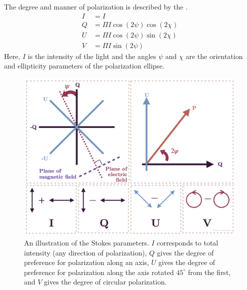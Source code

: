 The degree and manner of polarization is described by the .
\begin{align}
    I &= I \\
    Q &= \Pi I \cos(2\psi) \cos(2\chi) \\
    U &= \Pi I \cos(2\psi) \sin(2\chi) \\
    V &= \Pi I \sin(2\psi)
\end{align}
Here, $I$ is the intensity of the light and the angles $\psi$ and $\chi$ are the orientation and ellipticity parameters of the polarization ellipse.
\begin{figure}
    \centering
    \includegraphics[width=0.5\linewidth]{figures/stokes.png}
    \caption{An illustration of the Stokes parameters. $I$ corresponds to total intensity (any direction of polarization), $Q$ gives the degree of preference for polarization along an axis, $U$ gives the degree of preference for polarization along the axis rotated $45^\circ$ from the first, and $V$ gives the degree of circular polarization.}
    \label{fig:stokes-parameters}
\end{figure}

